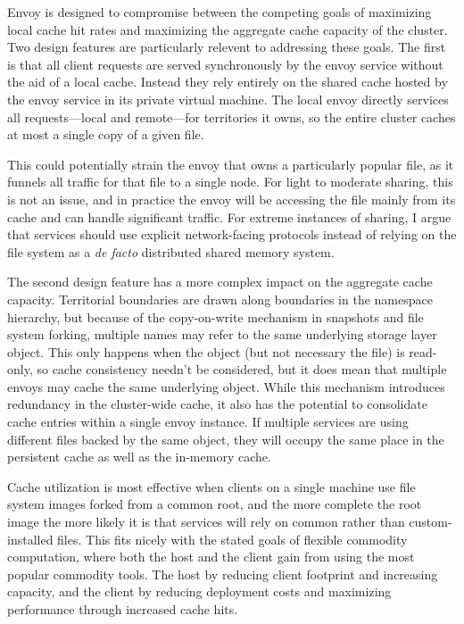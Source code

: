 Envoy is designed to compromise between the competing goals of maximizing local cache hit rates and maximizing the aggregate cache capacity of the cluster. Two design features are particularly relevent to addressing these goals. The first is that all client requests are served synchronously by the envoy service without the aid of a local cache. Instead they rely entirely on the shared cache hosted by the envoy service in its private virtual machine. The local envoy directly services all requests---local and remote---for territories it owns, so the entire cluster caches at most a single copy of a given file.

This could potentially strain the envoy that owns a particularly popular file, as it funnels all traffic for that file to a single node. For light to moderate sharing, this is not an issue, and in practice the envoy will be accessing the file mainly from its cache and can handle significant traffic. For extreme instances of sharing, I argue that services should use explicit network-facing protocols instead of relying on the file system as a \emph{de facto} distributed shared memory system.

The second design feature has a more complex impact on the aggregate cache capacity. Territorial boundaries are drawn along boundaries in the namespace hierarchy, but because of the copy-on-write mechanism in snapshots and file system forking, multiple names may refer to the same underlying storage layer object. This only happens when the object (but not necessary the file) is read-only, so cache consistency needn't be considered, but it does mean that multiple envoys may cache the same underlying object. While this mechanism introduces redundancy in the cluster-wide cache, it also has the potential to consolidate cache entries within a single envoy instance. If multiple services are using different files backed by the same object, they will occupy the same place in the persistent cache as well as the in-memory cache.

Cache utilization is most effective when clients on a single machine use file system images forked from a common root, and the more complete the root image the more likely it is that services will rely on common rather than custom-installed files. This fits nicely with the stated goals of flexible commodity computation, where both the host and the client gain from using the most popular commodity tools. The host by reducing client footprint and increasing capacity, and the client by reducing deployment costs and maximizing performance through increased cache hits.

